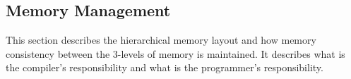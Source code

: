 
\subsection{Memory Management}

This section describes the hierarchical memory layout and how memory consistency between the 3-levels of memory is maintained.  It describes what is the compiler's responsibility and what is the programmer's responsibility.






